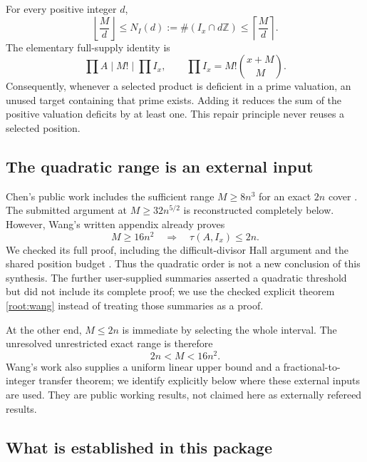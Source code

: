 \documentclass[11pt,a4paper]{article}
\theoremstyle{remark}
\begin{document}
For every positive integer \(d\),
\begin{equation}
 \left\lfloor\frac Md\right\rfloor
 \le N_I(d):=\#(I_x\cap d\mathbb Z)
 \le\left\lceil\frac Md\right\rceil.
 \label{root:counts}
\end{equation}
The elementary full-supply identity is
\begin{equation}
 \prod A\mid M!\mid\prod I_x,
 \qquad \prod I_x=M!\binom{x+M}{M}.
 \label{root:supply}
\end{equation}
Consequently, whenever a selected product is deficient in a prime
valuation, an unused target containing that prime exists. Adding it
reduces the sum of the positive valuation deficits by at least one.
This repair principle never reuses a selected position.

\subsection{The quadratic range is an external input}

Chen's public work includes the sufficient range \(M\ge8n^3\)
for an exact \(2n\) cover \cite{Chen}. The submitted argument at
\(M\ge32n^{5/2}\) is reconstructed completely below. However, Wang's
written appendix already proves
\begin{equation}
 M\ge16n^2\quad\Longrightarrow\quad\tau(A,I_x)\le2n.
 \label{root:wang}
\end{equation}
We checked its full proof, including the difficult-divisor Hall
argument and the shared position budget \cite[Appendix A]{Wang}.
Thus the quadratic order is not a new conclusion of this synthesis.
The further user-supplied summaries asserted a quadratic threshold
but did not include its complete proof; we use the checked explicit
theorem \eqref{root:wang} instead of treating those summaries as a proof.

At the other end, \(M\le2n\) is immediate by selecting the whole
interval. The unresolved unrestricted exact range is therefore
\begin{equation}
 \boxed{2n<M<16n^2.}
 \label{root:range}
\end{equation}
Wang's work also supplies a uniform linear upper bound and a
fractional-to-integer transfer theorem; we identify explicitly below
where these external inputs are used. They are public working
results, not claimed here as externally refereed results.

\subsection{What is established in this package}
\end{document}
